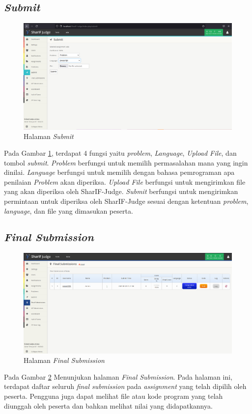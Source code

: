 \subsection{\textit{Submit}}
\label{sec: Submit}

 \begin{figure}[h!]
     \centering
     \includegraphics[width=0.9\linewidth]{Gambar/Submit_view.png}
     \caption{Halaman \textit{Submit}}
     \label{fig:Submit}
 \end{figure}
 Pada Gambar \ref{fig:Submit}, terdapat 4 fungsi yaitu \textit{problem}, \textit{Language}, \textit{Upload File}, dan tombol \textit{submit}. \textit{Problem} berfungsi untuk memilih permasalahan mana yang ingin dinilai. \textit{Language} berfungsi untuk memilih dengan bahasa pemrograman apa penilaian \textit{Problem} akan diperiksa. \textit{Upload File} berfungsi untuk mengirimkan file yang akan diperiksa oleh SharIF-Judge. \textit{Submit} berfungsi untuk mengirimkan permintaan untuk diperiksa oleh SharIF-Judge sesuai dengan ketentuan \textit{problem}, \textit{language}, dan file yang dimasukan peserta.
 
 \newpage
 \subsection{\textit{Final Submission}}
\label{sec: Final Submission}

 \begin{figure}[h!]
     \centering
     \includegraphics[width=0.9\linewidth]{Gambar/Final_Submission.png}
     \caption{Halaman \textit{Final Submission}}
     \label{fig:Submission}
 \end{figure}
 Pada Gambar \ref{fig:Submission} Menunjukan halaman \textit{Final Submission}. Pada halaman ini, terdapat daftar seluruh \textit{final submission} pada \textit{assignment} yang telah dipilih oleh peserta. Pengguna juga dapat melihat file atau kode program yang telah diunggah oleh peserta dan bahkan melihat nilai yang didapatkannya.


